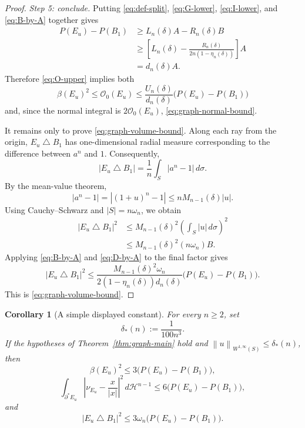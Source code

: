 \documentclass[11pt]{amsart}
\newtheorem{corollary}[theorem]{Corollary}
\theoremstyle{definition}
\newcommand{\Hn}{\mathcal H^{n-1}}
\newcommand{\norm}[1]{\left\|#1\right\|}
\newcommand{\Per}{P}
\newcommand{\osc}{\mathcal O}
\begin{document}
\begin{proof}
\smallskip\noindent\emph{Step 5: conclude.}
Putting \eqref{eq:def-split}, \eqref{eq:G-lower},
\eqref{eq:I-lower}, and \eqref{eq:B-by-A} together gives
\[
\begin{aligned}
   \Per(E_u)-\Per(B_1)
   &\ge L_n(\delta)A-R_n(\delta)B \\
   &\ge
   \left[
     L_n(\delta)-
     \frac{R_n(\delta)}{2n(1-\eta_n(\delta))}
   \right]A \\
   &=d_n(\delta)A.
\end{aligned}
\tag{3.36}\label{eq:D-by-A}
\]
Therefore \eqref{eq:O-upper} implies both
\[
   \beta(E_u)^2\le \osc_0(E_u)
   \le\frac{U_n(\delta)}{d_n(\delta)}
   \bigl(\Per(E_u)-\Per(B_1)\bigr)
\]
and, since the normal integral is \(2\osc_0(E_u)\),
\eqref{eq:graph-normal-bound}.

It remains only to prove \eqref{eq:graph-volume-bound}.  Along each ray from
the origin, \(E_u\mathbin{\triangle}B_1\) has one-dimensional radial measure
corresponding to the difference between \(a^n\) and \(1\).  Consequently,
\[
   |E_u\mathbin{\triangle}B_1|
   =\frac1n\int_S|a^n-1|\,d\sigma.
\tag{3.37}\label{eq:symdiff-formula}
\]
By the mean-value theorem,
\[
   |a^n-1|
   =|(1+u)^n-1|
   \le nM_{n-1}(\delta)|u|.
\]
Using Cauchy--Schwarz and \(|S|=n\omega_n\), we obtain
\[
\begin{aligned}
   |E_u\mathbin{\triangle}B_1|^2
   &\le M_{n-1}(\delta)^2
       \left(\int_S|u|\,d\sigma\right)^2 \\
   &\le M_{n-1}(\delta)^2(n\omega_n)B.
\end{aligned}
\tag{3.38}\label{eq:symdiff-B}
\]
Applying \eqref{eq:B-by-A} and \eqref{eq:D-by-A} to the final factor gives
\[
   |E_u\mathbin{\triangle}B_1|^2
   \le
   \frac{M_{n-1}(\delta)^2\omega_n}
        {2(1-\eta_n(\delta))d_n(\delta)}
       \bigl(\Per(E_u)-\Per(B_1)\bigr).
\]
This is \eqref{eq:graph-volume-bound}.
\end{proof}

\begin{corollary}[A simple displayed constant]\label{cor:graph-simple}
For every \(n\ge2\), set
\[
   \delta_*(n):=\frac1{100n^3}.
\tag{3.39}\label{eq:delta-star}
\]
If the hypotheses of Theorem~\ref{thm:graph-main} hold and
\(\norm{u}_{W^{1,\infty}(S)}\le\delta_*(n)\), then
\[
   \beta(E_u)^2
   \le3\bigl(\Per(E_u)-\Per(B_1)\bigr),
\tag{3.40}\label{eq:simple-beta}
\]
\[
   \int_{\partial^*E_u}
       \left|\nu_{E_u}-\frac{x}{|x|}\right|^2\,d\Hn
   \le6\bigl(\Per(E_u)-\Per(B_1)\bigr),
\tag{3.41}\label{eq:simple-normal}
\]
and
\[
   |E_u\mathbin{\triangle}B_1|^2
   \le3\omega_n\bigl(\Per(E_u)-\Per(B_1)\bigr).
\tag{3.42}\label{eq:simple-volume}
\]
\end{corollary}
\end{document}
